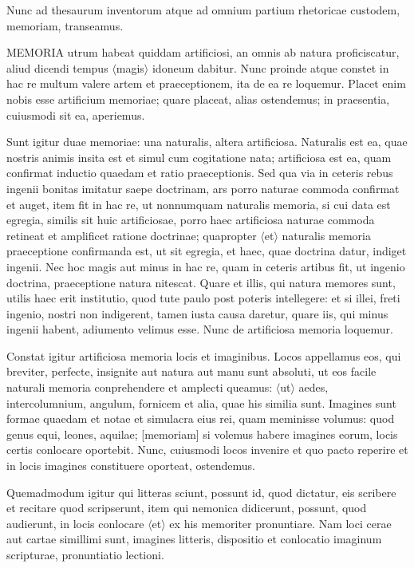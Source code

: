 Nunc ad thesaurum inventorum atque ad omnium partium rhetoricae custodem, memoriam, transeamus.

MEMORIA utrum habeat quiddam artificiosi, an omnis ab natura proficiscatur, aliud dicendi tempus $\langle$magis$\rangle$ idoneum dabitur. Nunc proinde atque constet in hac re multum valere artem et praeceptionem, ita de ea re loquemur. Placet enim nobis esse artificium memoriae; quare placeat, alias ostendemus; in praesentia, cuiusmodi sit ea, aperiemus.

Sunt igitur duae memoriae: una naturalis, altera artificiosa. Naturalis est ea, quae nostris animis insita est et simul cum cogitatione nata; artificiosa est ea, quam confirmat inductio quaedam et ratio praeceptionis. Sed qua via in ceteris rebus ingenii bonitas imitatur saepe doctrinam, ars porro naturae commoda confirmat et auget, item fit in hac re, ut nonnumquam naturalis memoria, si cui data est egregia, similis sit huic artificiosae, porro haec artificiosa naturae commoda retineat et amplificet ratione doctrinae; quapropter $\langle$et$\rangle$ naturalis memoria praeceptione confirmanda est, ut sit egregia, et haec, quae doctrina datur, indiget ingenii. Nec hoc magis aut minus in hac re, quam in ceteris artibus fit, ut ingenio doctrina, praeceptione natura nitescat. Quare et illis, qui natura memores sunt, utilis haec erit institutio, quod tute paulo post poteris intellegere: et si illei, freti ingenio, nostri non indigerent, tamen iusta causa daretur, quare iis, qui minus ingenii habent, adiumento velimus esse. Nunc de artificiosa memoria loquemur.

Constat igitur artificiosa memoria locis et imaginibus. Locos appellamus eos, qui breviter, perfecte, insignite aut natura aut manu sunt absoluti, ut eos facile naturali memoria conprehendere et amplecti queamus: $\langle$ut$\rangle$ aedes, intercolumnium, angulum, fornicem et alia, quae his similia sunt. Imagines sunt formae quaedam et notae et simulacra eius rei, quam meminisse volumus: quod genus equi, leones, aquilae; [memoriam] si volemus habere imagines eorum, locis certis conlocare oportebit. Nunc, cuiusmodi locos invenire et quo pacto reperire et in locis imagines constituere oporteat, ostendemus.

Quemadmodum igitur qui litteras sciunt, possunt id, quod dictatur, eis scribere et recitare quod scripserunt, item qui nemonica didicerunt, possunt, quod audierunt, in locis conlocare $\langle$et$\rangle$ ex his memoriter pronuntiare. Nam loci cerae aut cartae simillimi sunt, imagines litteris, dispositio et conlocatio imaginum scripturae, pronuntiatio lectioni.

